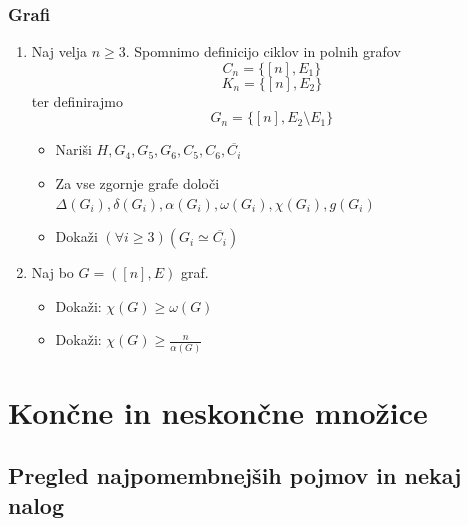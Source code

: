 \documentclass[11pt,paper=b5,footinclude,headinclude]{scrbook} %
\begin{document}
\subsection{Grafi}
\begin{enumerate}
\item Naj velja $n\ge 3$. Spomnimo definicijo ciklov in polnih grafov
\[C_{n}=\{[n], E_{1}\}\]
\[K_{n}=\{[n], E_{2}\}\]
ter definirajmo 
\[G_{n}=\{[n], E_{2} \setminus E_{1}\}\]
\begin{itemize}
    \item Nariši \(H, G_{4}, G_{5}, G_{6}, C_{5}, C_{6}, \overline{C_{i}}\)
    \item Za  vse zgornje grafe določi \(\Delta(G_{i}), \delta(G_{i}), \alpha(G_{i}), \omega(G_{i}), \chi(G_{i}), g(G_{i})\)
    \item
Dokaži \((\forall i \geq 3) (G_{i} \simeq \overline{C_{i}})\)
\end{itemize}


\item
Naj bo \(G = ([n], E)\) graf.
\begin{itemize}
\item
Dokaži: \(\chi (G) \geq \omega (G)\)

\item
Dokaži: \(\chi (G) \geq \frac{n}{\alpha(G)}\)
\end{itemize}

\end{enumerate}

\chapter{Končne in neskončne množice}

\section{Pregled najpomembnejših pojmov in nekaj nalog}
\end{document}
